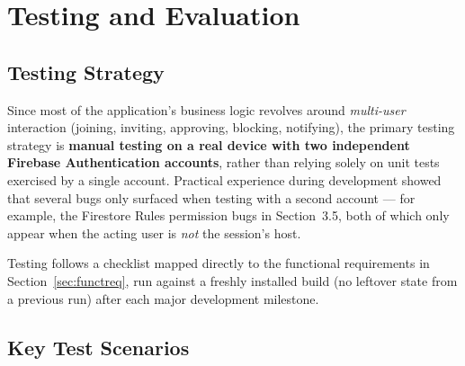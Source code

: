 \section{Testing and Evaluation}

\subsection{Testing Strategy}

Since most of the application's business logic revolves around \emph{multi-user} interaction (joining, inviting, approving, blocking, notifying), the primary testing strategy is \textbf{manual testing on a real device with two independent Firebase Authentication accounts}, rather than relying solely on unit tests exercised by a single account. Practical experience during development showed that several bugs only surfaced when testing with a second account — for example, the Firestore Rules permission bugs in Section~3.5, both of which only appear when the acting user is \emph{not} the session's host.

Testing follows a checklist mapped directly to the functional requirements in Section~\ref{sec:functreq}, run against a freshly installed build (no leftover state from a previous run) after each major development milestone.

\subsection{Key Test Scenarios}

